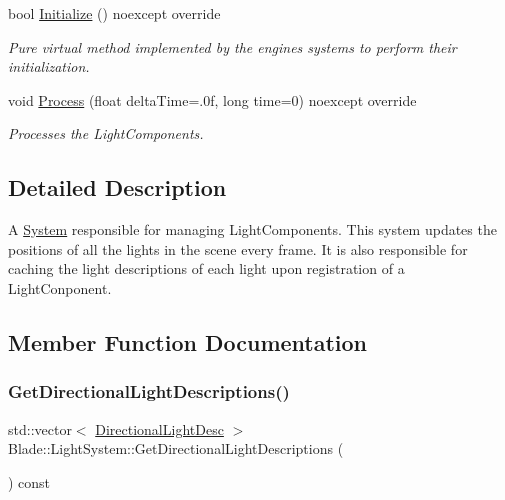 \begin{DoxyCompactItemize}
bool \hyperlink{class_blade_1_1_light_system_af87b68ecd946b49576a17e59bfc88934}{Initialize} () noexcept override
\begin{DoxyCompactList}\small\item\em Pure virtual method implemented by the engine\textquotesingle{}s systems to perform their initialization. \end{DoxyCompactList}\item 
void \hyperlink{class_blade_1_1_light_system_afbad47302dca40e57322a68252cb08e7}{Process} (float delta\+Time=.\+0f, long time=0) noexcept override
\begin{DoxyCompactList}\small\item\em Processes the Light\+Components. \end{DoxyCompactList}\end{DoxyCompactItemize}


\subsection{Detailed Description}
A \hyperlink{class_blade_1_1_system}{System} responsible for managing Light\+Components. This system updates the positions of all the lights in the scene every frame. It is also responsible for caching the light descriptions of each light upon registration of a Light\+Conponent. 

\subsection{Member Function Documentation}
\mbox{\label{class_blade_1_1_light_system_a9efaf399620fc75c86fd6032b9291651}} 
\subsubsection{\texorpdfstring{Get\+Directional\+Light\+Descriptions()}{GetDirectionalLightDescriptions()}}
{\footnotesize\ttfamily std\+::vector$<$ \hyperlink{struct_blade_1_1_directional_light_desc}{Directional\+Light\+Desc} $>$ Blade\+::\+Light\+System\+::\+Get\+Directional\+Light\+Descriptions (\begin{DoxyParamCaption}{ }\end{DoxyParamCaption}) const\hspace{0.3cm}{\ttfamily [noexcept]}}



